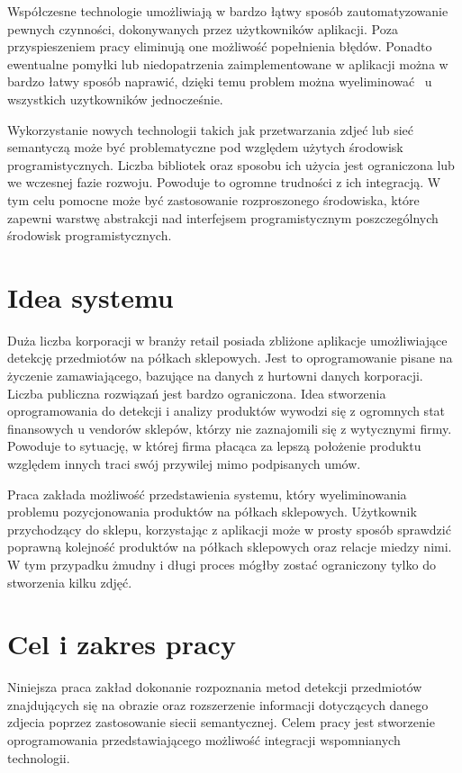Współczesne technologie umożliwiają w bardzo łątwy sposób zautomatyzowanie pewnych czynności, dokonywanych przez użytkowników aplikacji. Poza przyspieszeniem pracy eliminują one możliwość popełnienia błędów. Ponadto ewentualne pomyłki lub niedopatrzenia zaimplementowane w aplikacji można w bardzo łatwy sposób naprawić, dzięki temu problem można wyeliminować ~u wszystkich uzytkowników jednocześnie. 

Wykorzystanie nowych technologii takich jak przetwarzania zdjeć lub sieć semantyczą może być problematyczne pod względem użytych środowisk programistycznych. Liczba bibliotek oraz sposobu ich użycia jest ograniczona lub we wczesnej fazie rozwoju. Powoduje to ogromne trudności z ich integracją. W tym celu pomocne może być zastosowanie rozproszonego środowiska, które zapewni warstwę abstrakcji nad interfejsem programistycznym poszczególnych środowisk programistycznych.

\section{Idea systemu}
Duża liczba korporacji w branży retail posiada zbliżone aplikacje umożliwiające detekcję przedmiotów na półkach sklepowych. Jest to oprogramowanie pisane na życzenie zamawiającego, bazujące na danych z hurtowni danych korporacji. Liczba publiczna rozwiązań jest bardzo ograniczona. 
Idea stworzenia oprogramowania do detekcji i analizy produktów wywodzi się z ogromnych stat finansowych u vendorów sklepów, którzy nie zaznajomili się z wytycznymi firmy. Powoduje to sytuację, w której firma płacąca za lepszą położenie produktu względem innych traci swój przywilej mimo podpisanych umów. 

Praca zakłada możliwość przedstawienia systemu, który wyeliminowania problemu pozycjonowania produktów na półkach sklepowych. Użytkownik przychodzący do sklepu, korzystając z aplikacji może w prosty sposób sprawdzić poprawną kolejność produktów na półkach sklepowych oraz relacje miedzy nimi. W tym przypadku żmudny i długi proces mógłby zostać ograniczony tylko do stworzenia kilku zdjęć. 

\section{Cel i zakres pracy}
Niniejsza praca zakład dokonanie rozpoznania metod detekcji przedmiotów znajdujących się na obrazie oraz rozszerzenie informacji dotyczących danego zdjecia poprzez zastosowanie siecii semantycznej. Celem pracy jest stworzenie oprogramowania przedstawiającego możliwość integracji wspomnianych technologii.

